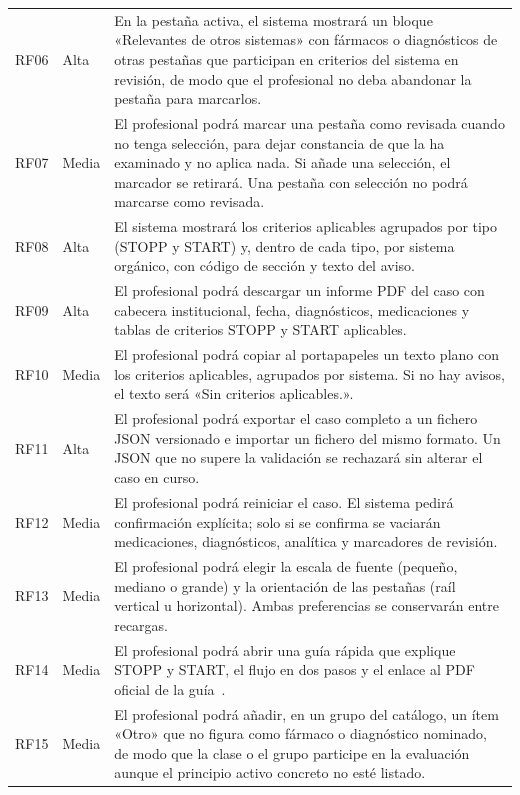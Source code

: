 {\begin{longtable}{@{}llp{9.2cm}@{}}
  RF06 & Alta & En la pestaña activa, el sistema mostrará un bloque
    «Relevantes de otros sistemas» con fármacos o diagnósticos de otras
    pestañas que participan en criterios del sistema en revisión, de modo
    que el profesional no deba abandonar la pestaña para marcarlos. \\
  RF07 & Media & El profesional podrá marcar una pestaña como revisada cuando
    no tenga selección, para dejar constancia de que la ha examinado y no
    aplica nada. Si añade una selección, el marcador se retirará. Una
    pestaña con selección no podrá marcarse como revisada. \\
  RF08 & Alta & El sistema mostrará los criterios aplicables agrupados por
    tipo (STOPP y START) y, dentro de cada tipo, por sistema orgánico,
    con código de sección y texto del aviso. \\
  RF09 & Alta & El profesional podrá descargar un informe PDF del caso con
    cabecera institucional, fecha, diagnósticos, medicaciones y tablas de
    criterios STOPP y START aplicables. \\
  RF10 & Media & El profesional podrá copiar al portapapeles un texto plano
    con los criterios aplicables, agrupados por sistema. Si no hay
    avisos, el texto será «Sin criterios aplicables.». \\
  RF11 & Alta & El profesional podrá exportar el caso completo a un fichero
    JSON versionado e importar un fichero del mismo formato. Un JSON que
    no supere la validación se rechazará sin alterar el caso en curso. \\
  RF12 & Media & El profesional podrá reiniciar el caso. El sistema pedirá
    confirmación explícita; solo si se confirma se vaciarán medicaciones,
    diagnósticos, analítica y marcadores de revisión. \\
  RF13 & Media & El profesional podrá elegir la escala de fuente (pequeño,
    mediano o grande) y la orientación de las pestañas (raíl vertical u
    horizontal). Ambas preferencias se conservarán entre recargas. \\
  RF14 & Media & El profesional podrá abrir una guía rápida que explique STOPP
    y START, el flujo en dos pasos y el enlace al PDF oficial de la
    guía~\cite{sacyl2023stopp}. \\
  RF15 & Media & El profesional podrá añadir, en un grupo del catálogo, un
    ítem «Otro» que no figura como fármaco o diagnóstico nominado, de modo
    que la clase o el grupo participe en la evaluación aunque el principio
    activo concreto no esté listado. \\
\end{longtable}
}


